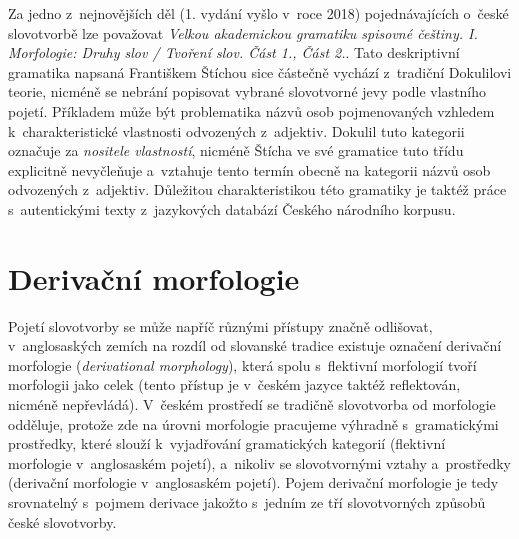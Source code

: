 Za jedno z~nejnovějších děl (1. vydání vyšlo v~roce 2018)
pojednávajících o~české slovotvorbě lze považovat \emph{Velkou
akademickou gramatiku spisovné češtiny. I. Morfologie: Druhy slov /
Tvoření slov. Část 1., Část 2.}. Tato deskriptivní gramatika napsaná
Františkem Štíchou sice částečně vychází z~tradiční Dokulilovi teorie,
nicméně se nebrání popisovat vybrané slovotvorné jevy podle vlastního
pojetí. Příkladem může být problematika názvů osob pojmenovaných
vzhledem k~charakteristické vlastnosti odvozených z~adjektiv. Dokulil
tuto kategorii označuje za \emph{nositele vlastností}, nicméně Štícha ve
své gramatice tuto třídu explicitně nevyčleňuje a~vztahuje tento termín
obecně na kategorii názvů osob odvozených z~adjektiv. Důležitou
charakteristikou této gramatiky je taktéž práce s~autentickými texty
z~jazykových databází Českého národního korpusu.~\parencite{sticha18}

\hypertarget{derivaux10dnuxed-morfologie}{%
\section{Derivační morfologie}\label{derivaux10dnuxed-morfologie}}

Pojetí slovotvorby se může napříč různými přístupy značně odlišovat,
v~anglosaských zemích na rozdíl od slovanské tradice existuje označení
derivační morfologie (\emph{derivational morphology}), která spolu
s~flektivní morfologií tvoří morfologii jako celek (tento přístup je
v~českém jazyce taktéž reflektován, nicméně nepřevládá).
\parencite{lieber14} V~českém prostředí se tradičně slovotvorba od
morfologie odděluje, protože zde na úrovni morfologie pracujeme výhradně
s~gramatickými prostředky, které slouží k~vyjadřování gramatických
kategorií (flektivní morfologie v~anglosaském pojetí), a~nikoliv se
slovotvornými vztahy a~prostředky (derivační morfologie v~anglosaském
pojetí). Pojem derivační morfologie je tedy srovnatelný s~pojmem
derivace jakožto s~jedním ze tří slovotvorných způsobů české
slovotvorby.
